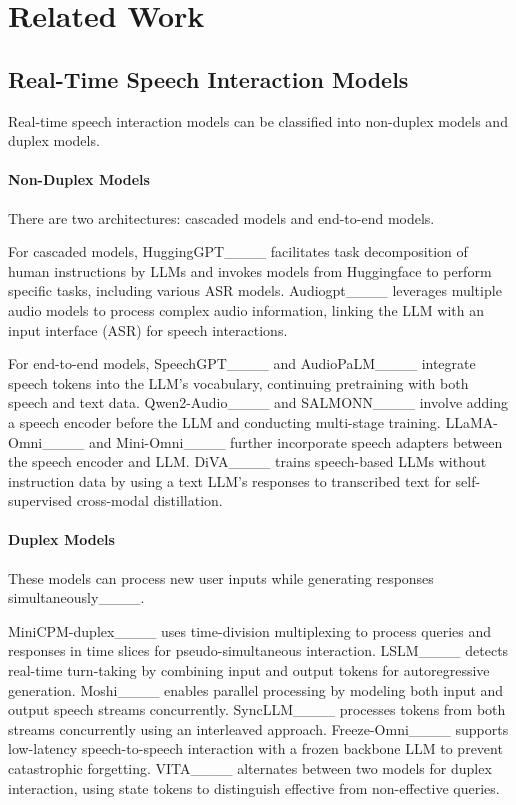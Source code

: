 \section{Related Work}
\label{sec5}
\subsection{Real-Time Speech Interaction Models}
Real-time speech interaction models can be classified into non-duplex models and duplex models.

\paragraph{Non-Duplex Models}
There are two architectures: cascaded models and end-to-end models.

For cascaded models, HuggingGPT____ facilitates task decomposition of human instructions by LLMs and invokes models from Huggingface to perform specific tasks, including various ASR models. 
Audiogpt____ leverages multiple audio models to process complex audio information, linking the LLM with an input interface (ASR) for speech interactions.

For end-to-end models, SpeechGPT____ and AudioPaLM____ integrate speech tokens into the LLM’s vocabulary, continuing pretraining with both speech and text data. 
Qwen2-Audio____ and SALMONN____ involve adding a speech encoder before the LLM and conducting multi-stage training. 
LLaMA-Omni____ and Mini-Omni____ further incorporate speech adapters between the speech encoder and LLM. 
DiVA____ trains speech-based LLMs without instruction data by using a text LLM’s responses to transcribed text for self-supervised cross-modal distillation.

\paragraph{Duplex Models}
These models can process new user inputs while generating responses simultaneously____.

MiniCPM-duplex____ uses time-division multiplexing to process queries and responses in time slices for pseudo-simultaneous interaction.
LSLM____ detects real-time turn-taking by combining input and output tokens for autoregressive generation.
Moshi____ enables parallel processing by modeling both input and output speech streams concurrently.
SyncLLM____ processes tokens from both streams concurrently using an interleaved approach.
Freeze-Omni____ supports low-latency speech-to-speech interaction with a frozen backbone LLM to prevent catastrophic forgetting.
VITA____ alternates between two models for duplex interaction, using state tokens to distinguish effective from non-effective queries.

